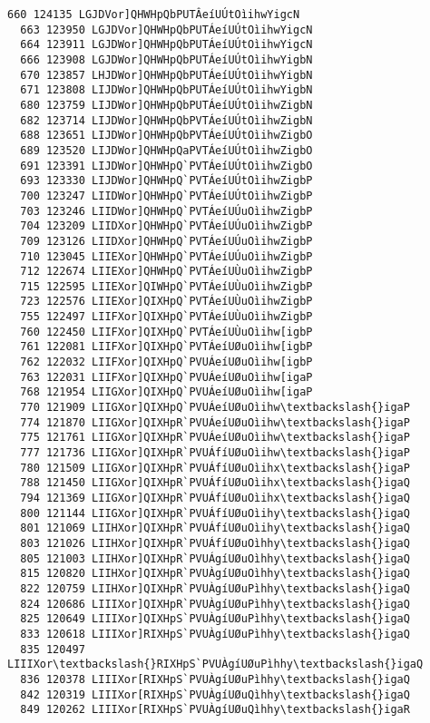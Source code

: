 \documentclass[11pt]{article}
\begin{document}
\begin{Verbatim}[commandchars=\\\{\}]
  660 124135 LGJDVor]QHWHpQbPUTÂeíUÚtOìihwYigcN
  663 123950 LGJDVor]QHWHpQbPUTÁeíUÚtOìihwYigcN
  664 123911 LGJDWor]QHWHpQbPUTÁeíUÚtOìihwYigcN
  666 123908 LGJDWor]QHWHpQbPUTÁeíUÚtOìihwYigbN
  670 123857 LHJDWor]QHWHpQbPUTÁeíUÚtOìihwYigbN
  671 123808 LIJDWor]QHWHpQbPUTÁeíUÚtOìihwYigbN
  680 123759 LIJDWor]QHWHpQbPUTÁeíUÚtOìihwZigbN
  682 123714 LIJDWor]QHWHpQbPVTÁeíUÚtOìihwZigbN
  688 123651 LIJDWor]QHWHpQbPVTÁeíUÚtOìihwZigbO
  689 123520 LIJDWor]QHWHpQaPVTÁeíUÚtOìihwZigbO
  691 123391 LIJDWor]QHWHpQ`PVTÁeíUÚtOìihwZigbO
  693 123330 LIJDWor]QHWHpQ`PVTÁeíUÚtOìihwZigbP
  700 123247 LIIDWor]QHWHpQ`PVTÁeíUÚtOìihwZigbP
  703 123246 LIIDWor]QHWHpQ`PVTÁeíUÚuOìihwZigbP
  704 123209 LIIDXor]QHWHpQ`PVTÁeíUÚuOìihwZigbP
  709 123126 LIIDXor]QHWHpQ`PVTÁeíUÚuOìihwZigbP
  710 123045 LIIEXor]QHWHpQ`PVTÁeíUÚuOìihwZigbP
  712 122674 LIIEXor]QHWHpQ`PVTÁeíUÙuOìihwZigbP
  715 122595 LIIEXor]QIWHpQ`PVTÁeíUÙuOìihwZigbP
  723 122576 LIIEXor]QIXHpQ`PVTÁeíUÙuOìihwZigbP
  755 122497 LIIFXor]QIXHpQ`PVTÁeíUÙuOìihwZigbP
  760 122450 LIIFXor]QIXHpQ`PVTÁeíUÙuOìihw[igbP
  761 122081 LIIFXor]QIXHpQ`PVTÁeíUØuOìihw[igbP
  762 122032 LIIFXor]QIXHpQ`PVUÁeíUØuOìihw[igbP
  763 122031 LIIFXor]QIXHpQ`PVUÁeíUØuOìihw[igaP
  768 121954 LIIGXor]QIXHpQ`PVUÁeíUØuOìihw[igaP
  770 121909 LIIGXor]QIXHpQ`PVUÁeíUØuOìihw\textbackslash{}igaP
  774 121870 LIIGXor]QIXHpR`PVUÁeíUØuOìihw\textbackslash{}igaP
  775 121761 LIIGXor]QIXHpR`PVUÁeíUØuOìihw\textbackslash{}igaP
  777 121736 LIIGXor]QIXHpR`PVUÁfíUØuOìihw\textbackslash{}igaP
  780 121509 LIIGXor]QIXHpR`PVUÁfíUØuOìihx\textbackslash{}igaP
  788 121450 LIIGXor]QIXHpR`PVUÁfíUØuOìihx\textbackslash{}igaQ
  794 121369 LIIGXor]QIXHpR`PVUÁfíUØuOìihx\textbackslash{}igaQ
  800 121144 LIIGXor]QIXHpR`PVUÁfíUØuOìihy\textbackslash{}igaQ
  801 121069 LIIHXor]QIXHpR`PVUÁfíUØuOìihy\textbackslash{}igaQ
  803 121026 LIIHXor]QIXHpR`PVUÁfíUØuOìhhy\textbackslash{}igaQ
  805 121003 LIIHXor]QIXHpR`PVUÁgíUØuOìhhy\textbackslash{}igaQ
  815 120820 LIIHXor]QIXHpR`PVUÀgíUØuOìhhy\textbackslash{}igaQ
  822 120759 LIIHXor]QIXHpR`PVUÀgíUØuPìhhy\textbackslash{}igaQ
  824 120686 LIIIXor]QIXHpR`PVUÀgíUØuPìhhy\textbackslash{}igaQ
  825 120649 LIIIXor]QIXHpS`PVUÀgíUØuPìhhy\textbackslash{}igaQ
  833 120618 LIIIXor]RIXHpS`PVUÀgíUØuPìhhy\textbackslash{}igaQ
  835 120497 LIIIXor\textbackslash{}RIXHpS`PVUÀgíUØuPìhhy\textbackslash{}igaQ
  836 120378 LIIIXor[RIXHpS`PVUÀgíUØuPìhhy\textbackslash{}igaQ
  842 120319 LIIIXor[RIXHpS`PVUÀgíUØuQìhhy\textbackslash{}igaQ
  849 120262 LIIIXor[RIXHpS`PVUÀgíUØuQìhhy\textbackslash{}igaR

\end{Verbatim}
\end{document}
